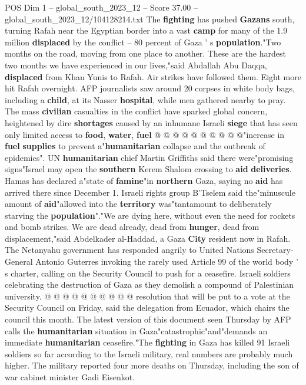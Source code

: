 \begin{textsample}{POS Dim 1 – global\_south\_2023\_12 – Score 37.00 – global\_south\_2023\_12/104128214.txt}
The \textbf{fighting} has pushed \textbf{Gazans} south, turning Rafah near the Egyptian border into a vast \textbf{camp} for many of the 1.9 million \textbf{displaced} by the conflict -- 80 percent of Gaza ' s \textbf{population}."Two months on the road, moving from one place to another.
These are the hardest two months we have experienced in our lives,"said Abdallah Abu Daqqa, \textbf{displaced} from Khan Yunis to Rafah.
Air strikes have followed them.
Eight more hit Rafah overnight.
AFP journalists saw around 20 corpses in white body bags, including a \textbf{child}, at its Nasser \textbf{hospital}, while men gathered nearby to pray.
The mass \textbf{civilian} casualties in the conflict have sparked global concern, heightened by dire \textbf{shortages} caused by an inhumane Israeli \textbf{siege} that has seen only limited access to \textbf{food}, \textbf{water}, \textbf{fuel} @ @ @ @ @ @ @ @ @ @"increase in \textbf{fuel} \textbf{supplies} to prevent a"\textbf{humanitarian} collapse and the outbreak of epidemics".
UN \textbf{humanitarian} chief Martin Griffiths said there were"promising signs"Israel may open the \textbf{southern} Kerem Shalom crossing to \textbf{aid} \textbf{deliveries}.
Hamas has declared a"state of \textbf{famine}"in \textbf{northern} Gaza, saying no \textbf{aid} has arrived there since December 1.
Israeli rights group B'Tselem said the"minuscule amount of \textbf{aid}"allowed into the \textbf{territory} was"tantamount to deliberately starving the \textbf{population}"."We are dying here, without even the need for rockets and bomb strikes.
We are dead already, dead from \textbf{hunger}, dead from displacement,"said Abdelkader al-Haddad, a Gaza \textbf{City} resident now in Rafah.
The Netanyahu government has responded angrily to United Nations Secretary-General Antonio Guterres invoking the rarely used Article 99 of the world body ' s charter, calling on the Security Council to push for a ceasefire.
Israeli soldiers celebrating the destruction of Gaza as they demolish a compound of Palestinian university. @ @ @ @ @ @ @ @ @ @ resolution that will be put to a vote at the Security Council on Friday, said the delegation from Ecuador, which chairs the council this month.
The latest version of this document seen Thursday by AFP calls the \textbf{humanitarian} situation in Gaza"catastrophic"and"demands an immediate \textbf{humanitarian} ceasefire."The \textbf{fighting} in Gaza has killed 91 Israeli soldiers so far according to the Israeli military, real numbers are probably much higher.
The military reported four more deaths on Thursday, including the son of war cabinet minister Gadi Eisenkot.

\end{textsample}
